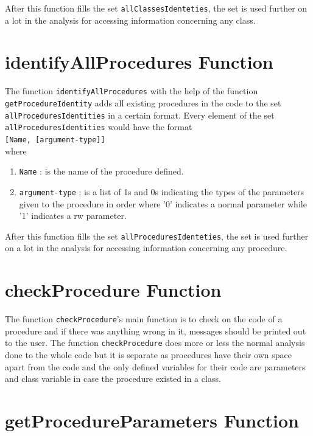 \documentclass[11pt]{report}
\begin{document}
After this function fills the set \texttt{allClassesIdenteties}, the set is used further on a lot in the analysis for accessing information concerning any class.

\section{identifyAllProcedures Function}

The function \texttt{identifyAllProcedures} with the help of the function \texttt{getProcedureIdentity} adds all existing procedures in the code to the set \texttt{allProceduresIdentities} in a certain format. Every element of the set \texttt{allProceduresIdentities} would have the format
\\[0.2cm]
\hspace*{0.6cm}
\texttt{[Name, [argument-type]]}
\\[0.2cm]
where
\begin{enumerate}
\item \texttt{Name} : is the name of the procedure defined.
\item \texttt{argument-type} : is a list of 1s and 0s indicating the types of the parameters given to the procedure in order where '0' indicates a normal parameter while '1' indicates a rw parameter.
\end{enumerate}

After this function fills the set \texttt{allProceduresIdenteties}, the set is used further on a lot in the analysis for accessing information concerning any procedure.

\section{checkProcedure Function}

The function \texttt{checkProcedure}'s main function is to check on the code of a procedure and if there was anything wrong in it, messages should be printed out to the user. The function \texttt{checkProcedure} does more or less the normal analysis done to the whole code but it is separate as procedures have their own space apart from the code and the only defined variables for their code are parameters and class variable in case the procedure existed in a class.

\section{getProcedureParameters Function}
\end{document}
